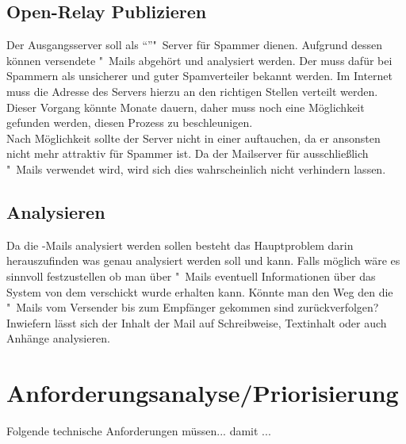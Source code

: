 \documentclass[a4paper,11pt,singlespacing]{article}
\begin{document}
	\subsection{Open-Relay Publizieren}\label{sec:ProblemstellungPublizieren}
		Der Ausgangsserver soll als "`"'"~Server für Spammer dienen.
		Aufgrund dessen können versendete "~Mails abgehört und analysiert werden.
		Der  muss dafür bei Spammern als unsicherer und guter Spamverteiler bekannt werden.
		Im Internet muss die Adresse des Servers hierzu an den richtigen Stellen verteilt werden. %
		Dieser Vorgang könnte Monate dauern, daher muss noch eine Möglichkeit gefunden werden, diesen Prozess zu beschleunigen.
		\\
		Nach Möglichkeit sollte der Server nicht in einer   auftauchen, da er ansonsten nicht mehr attraktiv für Spammer ist.
		Da der Mailserver für ausschließlich "~Mails verwendet wird, wird sich dies wahrscheinlich nicht verhindern lassen.

	\subsection{Analysieren}\label{sec:ProblemstellungAnalysieren}
		Da die -Mails analysiert werden sollen besteht das Hauptproblem darin herauszufinden was genau analysiert werden soll und kann.
		Falls möglich wäre es sinnvoll festzustellen ob man über "~Mails eventuell Informationen über das System von dem verschickt wurde erhalten kann.
		Könnte man den Weg den die "~Mails vom Versender bis zum Empfänger gekommen sind zurückverfolgen?
		Inwiefern lässt sich der Inhalt der Mail auf Schreibweise, Textinhalt oder auch Anhänge analysieren.


\section{Anforderungsanalyse/Priorisierung}\label{sec:AnforderungsanalysePriorisierung}
	Folgende technische Anforderungen müssen... damit ...
\end{document}

